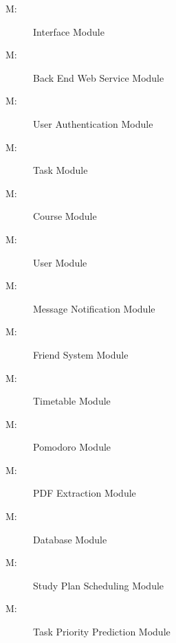 \documentclass[12pt, titlepage]{article}
\newcounter{mnum}
\newcommand{\mthemnum}{M\themnum}
\begin{document}
\begin{description}
\item [ \mthemnum \label{mIM}:] Interface Module
\item [ \mthemnum \label{mBEWS}:] Back End Web Service Module
\item [ \mthemnum \label{mUserAM}:] User Authentication Module
\item [ \mthemnum \label{mTaskAM}:] Task Module
\item [ \mthemnum \label{mCM}:] Course Module
\item [ \mthemnum \label{mUM}:] User Module
\item [ \mthemnum \label{mMsgNM}:] Message Notification Module
\item [ \mthemnum \label{mFRSM}:] Friend System Module
\item [ \mthemnum \label{mTM}:] Timetable Module
\item [ \mthemnum \label{mPM}:] Pomodoro Module
\item [ \mthemnum \label{mPEM}:] PDF Extraction Module
\item [ \mthemnum \label{mDTM}:] Database Module
\item [ \mthemnum \label{mSPSM}:] Study Plan Scheduling Module
\item [ \mthemnum \label{mTPPM}:] Task Priority Prediction Module
\end{description}
\end{document}
